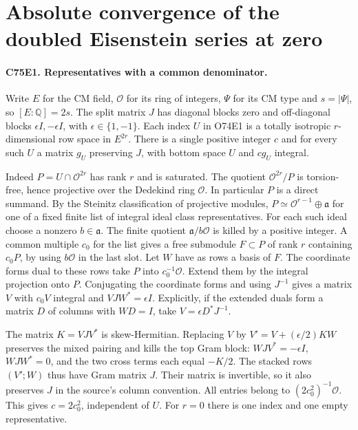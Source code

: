 \section{Absolute convergence of the doubled Eisenstein series at zero}

\paragraph{C75E1. Representatives with a common denominator.}
Write $E$ for the CM field, $\mathcal O$ for its ring of integers,
$\Psi$ for its CM type and $s=|\Psi|$, so $[E:\mathbb Q]=2s$.
The split matrix $J$ has diagonal blocks zero and off-diagonal blocks
$\epsilon I,-\epsilon I$, with $\epsilon\in\{1,-1\}$. Each index
$U$ in O74E1 is a totally isotropic $r$-dimensional row space in
$E^{2r}$. There is a single positive integer $c$ and for every such
$U$ a matrix $g_U$ preserving $J$, with bottom space $U$ and
$c g_U$ integral.

Indeed $P=U\cap\mathcal O^{2r}$ has rank $r$ and is saturated.
The quotient $\mathcal O^{2r}/P$ is torsion-free, hence projective
over the Dedekind ring $\mathcal O$. In particular $P$ is a direct
summand. By the Steinitz classification of projective modules,
$P\simeq\mathcal O^{r-1}\oplus\mathfrak a$ for one of a fixed
finite list of integral ideal class representatives. For each such
ideal choose a nonzero $b\in\mathfrak a$. The finite quotient
$\mathfrak a/b\mathcal O$ is killed by a positive integer. A common
multiple $c_0$ for the list gives a free submodule $F\subset P$ of
rank $r$ containing $c_0P$, by using $b\mathcal O$ in the last slot.
Let $W$ have as rows a basis of $F$. The coordinate forms dual to
these rows take $P$ into $c_0^{-1}\mathcal O$. Extend them by the
integral projection onto $P$. Conjugating the coordinate forms and
using $J^{-1}$ gives a matrix $V$ with $c_0V$ integral and
$VJW^*=\epsilon I$. Explicitly, if the extended duals form a matrix
$D$ of columns with $WD=I$, take $V=\epsilon D^*J^{-1}$.

The matrix $K=VJV^*$ is skew-Hermitian. Replacing $V$ by
$V'=V+(\epsilon/2)KW$ preserves the mixed pairing and kills the
top Gram block: $WJV^*=-\epsilon I$, $WJW^*=0$, and the two cross
terms each equal $-K/2$. The stacked rows $(V';W)$ thus have Gram
matrix $J$. Their matrix is invertible, so it also preserves $J$ in
the source's column convention. All entries belong to
$(2c_0^2)^{-1}\mathcal O$. This gives $c=2c_0^2$, independent of
$U$. For $r=0$ there is one index and one empty representative.

